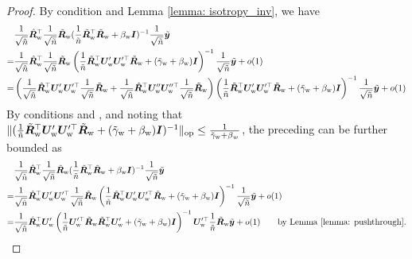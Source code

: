 \begin{proof}
By condition \bounded{} and Lemma \ref{lemma: isotropy_inv}, we have
\begin{align}
\nonumber
   & \frac{1}{\sqrt{\hat{n}}} \hat{{\bm{R}}}_{\text{w}}^\top  \frac{1}{\sqrt{\tilde{n}}}\tilde{{\bm{R}}}_{\text{w}} (\frac{1}{\tilde{n}}\tilde{{\bm{R}}}_{\text{w}}^\top \tilde{{\bm{R}}}_{\text{w}} + \beta_{\text{w}}{\bm{I}} )^{-1}\frac{1}{\sqrt{\tilde{n}}}\tilde{{\bm{y}}} \\
   \nonumber
    = & \frac{1}{\sqrt{\hat{n}}} \hat{{\bm{R}}}_{\text{w}}^\top  \frac{1}{\sqrt{\tilde{n}}}\tilde{{\bm{R}}}_{\text{w}} \left(\frac{1}{\tilde{n}}\tilde{{\bm{R}}}_{\text{w}}^\top {\bm{U}}_{\text{w}}'{\bm{U}}_{\text{w}}'^\top\tilde{{\bm{R}}}_{\text{w}} +(\tilde{\gamma}_{\text{w}}+ \beta_{\text{w}}){\bm{I}} \right)^{-1}\frac{1}{\sqrt{\tilde{n}}}\tilde{{\bm{y}}} + o(1) \\
    \nonumber
    = & \left(\frac{1}{\sqrt{\hat{n}}} \hat{{\bm{R}}}_{\text{w}}^\top {\bm{U}}_{\text{w}}'{\bm{U}}_{\text{w}}'^\top \frac{1}{\sqrt{\tilde{n}}}\tilde{{\bm{R}}}_{\text{w}}+\frac{1}{\sqrt{\hat{n}}} \hat{{\bm{R}}}_{\text{w}}^\top {\bm{U}}_{\text{w}}''{\bm{U}}_{\text{w}}''^\top \frac{1}{\sqrt{\tilde{n}}}\tilde{{\bm{R}}}_{\text{w}}\right) \left(\frac{1}{\tilde{n}}\tilde{{\bm{R}}}_{\text{w}}^\top {\bm{U}}_{\text{w}}'{\bm{U}}_{\text{w}}'^\top\tilde{{\bm{R}}}_{\text{w}} +(\tilde{\gamma}_{\text{w}}+ \beta_{\text{w}}){\bm{I}} \right)^{-1}\frac{1}{\sqrt{\tilde{n}}}\tilde{{\bm{y}}} + o(1) 
\end{align}
By conditions \smallin{} and \bounded{}, and noting that $\lVert (\frac{1}{\tilde{n}}\tilde{{\bm{R}}}_{\text{w}}^\top {\bm{U}}_{\text{w}}'{\bm{U}}_{\text{w}}'^\top\tilde{{\bm{R}}}_{\text{w}} +(\tilde{\gamma}_{\text{w}}+ \beta_{\text{w}}){\bm{I}})^{-1} \rVert_{\mathrm{op}} \leq \frac{1}{\tilde{\gamma}_{\text{w}}+\beta_w} $,
the preceding can be further bounded as 
\begin{align}
\nonumber
& \frac{1}{\sqrt{\hat{n}}} \hat{\mR}_\w^\top  \frac{1}{\sqrt{\tilde{n}}}\tilde{\mR}_\w (\frac{1}{\tilde{n}}\tilde{\mR}_\w^\top \tilde{\mR}_\w + \beta_\w\mI )^{-1}\frac{1}{\sqrt{\tilde{n}}}\tilde{\vy} \\
\nonumber
= & \frac{1}{\sqrt{\hat{n}}} \hat{\mR}_\w^\top \mU_\w'\mU_\w'^\top  \frac{1}{\sqrt{\tilde{n}}}\tilde{\mR}_\w \left(\frac{1}{\tilde{n}}\tilde{\mR}_\w^\top \mU_\w'\mU_\w'^\top\tilde{\mR}_\w +(\tilde{\gamma}_\w+ \beta_\w)\mI \right)^{-1}\frac{1}{\sqrt{\tilde{n}}}\tilde{\vy} + o(1) \\
     \nonumber
     = & \frac{1}{\sqrt{\hat{n}}} \hat{\mR}_\w^\top \mU_\w' \left(\frac{1}{\tilde{n}} \mU_\w'^\top\tilde{\mR}_\w \tilde{\mR}_\w^\top \mU_\w'+(\tilde{\gamma}_\w+ \beta_\w)\mI \right)^{-1} \mU_\w'^\top \frac{1}{\tilde{n}} \tilde{\mR}_\w \tilde{\vy} + o(1) \quad\quad\text{by Lemma \ref{lemma: pushthrough}.}

\end{align}
\end{proof}
